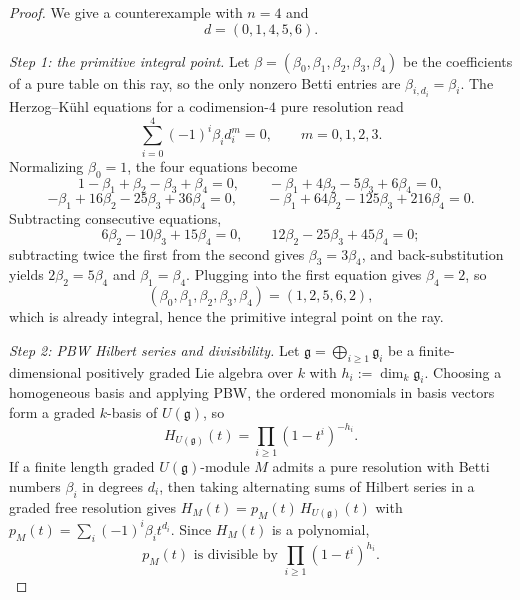 \documentclass[11pt,reqno]{amsart}
\numberwithin{equation}{section}
\theoremstyle{definition}
\begin{document}
\begin{proof}
We give a counterexample with $n=4$ and
\[
   d=(0,1,4,5,6).
\]

\smallskip
\noindent\emph{Step 1: the primitive integral point.} Let
$\beta=(\beta_0,\beta_1,\beta_2,\beta_3,\beta_4)$ be the coefficients of
a pure table on this ray, so the only nonzero Betti entries are
$\beta_{i,d_i}=\beta_i$. The Herzog--K\"uhl equations for a codimension-$4$
pure resolution read
\[
   \sum_{i=0}^4 (-1)^i \beta_i d_i^m=0,\qquad m=0,1,2,3.
\]
Normalizing $\beta_0=1$, the four equations become
\[
   1-\beta_1+\beta_2-\beta_3+\beta_4=0,\qquad
   -\beta_1+4\beta_2-5\beta_3+6\beta_4=0,
\]
\[
   -\beta_1+16\beta_2-25\beta_3+36\beta_4=0,\qquad
   -\beta_1+64\beta_2-125\beta_3+216\beta_4=0.
\]
Subtracting consecutive equations,
\[
   6\beta_2-10\beta_3+15\beta_4=0,\qquad
   12\beta_2-25\beta_3+45\beta_4=0;
\]
subtracting twice the first from the second gives $\beta_3=3\beta_4$, and
back-substitution yields $2\beta_2=5\beta_4$ and $\beta_1=\beta_4$.
Plugging into the first equation gives $\beta_4=2$, so
\[
   (\beta_0,\beta_1,\beta_2,\beta_3,\beta_4)=(1,2,5,6,2),
\]
which is already integral, hence the primitive integral point on the
ray.

\smallskip
\noindent\emph{Step 2: PBW Hilbert series and divisibility.} Let
$\mathfrak g=\bigoplus_{i\ge 1}\mathfrak g_i$ be a finite-dimensional
positively graded Lie algebra over $k$ with $h_i:=\dim_k\mathfrak g_i$.
Choosing a homogeneous basis and applying PBW, the ordered monomials in
basis vectors form a graded $k$-basis of $U(\mathfrak g)$, so
\[
   H_{U(\mathfrak g)}(t)=\prod_{i\ge 1}(1-t^i)^{-h_i}.
\]
If a finite length graded $U(\mathfrak g)$-module $M$ admits a pure
resolution with Betti numbers $\beta_i$ in degrees $d_i$, then taking
alternating sums of Hilbert series in a graded free resolution gives
$H_M(t)=p_M(t)\,H_{U(\mathfrak g)}(t)$ with $p_M(t)=\sum_i(-1)^i\beta_i
t^{d_i}$. Since $H_M(t)$ is a polynomial,
\[
   p_M(t) \text{ is divisible by } \prod_{i\ge 1}(1-t^i)^{h_i}.
\]


\end{proof}
\end{document}
